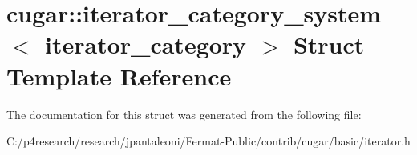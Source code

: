 \hypertarget{structcugar_1_1iterator__category__system}{}\section{cugar\+:\+:iterator\+\_\+category\+\_\+system$<$ iterator\+\_\+category $>$ Struct Template Reference}
\label{structcugar_1_1iterator__category__system}


The documentation for this struct was generated from the following file\+:\begin{DoxyCompactItemize}
\item 
C\+:/p4research/research/jpantaleoni/\+Fermat-\/\+Public/contrib/cugar/basic/iterator.\+h\end{DoxyCompactItemize}
